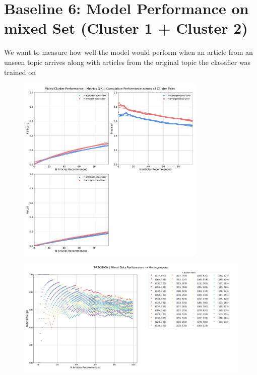 \documentclass[a4paper,fontsize=8.0pt]{scrartcl}
\begin{document}
\newpage
\section{Baseline 6: Model Performance on mixed Set (Cluster 1 + Cluster 2)}
\begin{flushleft}
We want to measure how well the model would perform when an article from an unseen topic arrives along with articles from the original topic the classifier was trained on
\end{flushleft}
\begin{figure}[H]
 \includegraphics[width=0.8\textwidth]{Graphs/user_interaction_vs_model_performance_cumu_mixed_cluster.pdf}
\end{figure}
\begin{figure}[H]
 \includegraphics[width=1.0\textwidth]{Graphs/user_interaction_vs_model_performance_precision_all_cps_mixed_data_Homogeneous.pdf}
\end{figure}
\end{document}
